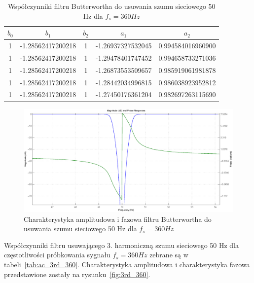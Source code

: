 \begin{table}[H]
\begin{center}
\begin{tabular}{|c|c|c|c|c|}
\hline
        $b_0$ & $b_1$ & $b_2$ & $a_1$ & $a_2$ \\
\hline
        1& -1.28562417200218& 1& -1.26937327532045&        0.994584016960900\\
\hline
        1& -1.28562417200218& 1& -1.29478401747452&        0.994658733271036\\
\hline
        1& -1.28562417200218& 1& -1.26873553509657&        0.985919061981878\\
\hline
        1& -1.28562417200218& 1& -1.28442034996815&        0.986038923952812\\
\hline
        1& -1.28562417200218& 1& -1.27450176361204&        0.982697263115690\\
\hline
\end{tabular} 
\caption{Współczynniki filtru Butterwortha do usuwania szumu sieciowego 50 Hz dla $f_s=360 Hz$}
\label{tab:ac_360}
\end{center}
\end{table}

\begin{figure}[H]
\centering
	\includegraphics[width=\textwidth]{ECG_BASELINE/figures/50hz_360.eps}
\caption{Charakterystyka amplitudowa i fazowa filtru Butterwortha do usuwania szumu sieciowego 50 Hz dla $f_s=360 Hz$}
\label{fig:50hz_360}
\end{figure}

\newpage{}

Współczynniki filtru usuwającego 3. harmoniczną szumu sieciowego 50 Hz dla częstotliwości próbkowania sygnału $f_s = 360 Hz$ zebrane są w tabeli~\ref{tab:ac_3rd_360}. Charakterystyka amplitudowa i charakterystyka fazowa przedstawione zostały na rysunku~\ref{fig:3rd_360}.

